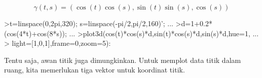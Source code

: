 \documentclass{article}
\begin{document}
\begin{eulernotebook}
\begin{eulercomment}
\begin{eulercomment}
\begin{eulercomment}
\end{eulercomment}
\begin{eulerformula}
\[
\gamma(t,s) = (\cos(t)\cos(s),\sin(t)\sin(s),\cos(s))
\]
\end{eulerformula}
\begin{eulercomment}
\end{eulercomment}
\begin{eulerprompt}
>t=linspace(0,2pi,320); s=linspace(-pi/2,pi/2,160)'; ...
>d=1+0.2*(cos(4*t)+cos(8*s)); ...
>plot3d(cos(t)*cos(s)*d,sin(t)*cos(s)*d,sin(s)*d,hue=1, ...
>  light=[1,0,1],frame=0,zoom=5):
\end{eulerprompt}
\begin{eulercomment}
Tentu saja, awan titik juga dimungkinkan. Untuk memplot data titik
dalam ruang, kita memerlukan tiga vektor untuk koordinat titik.


\end{eulercomment}
\end{eulercomment}
\end{eulercomment}
\end{eulernotebook}
\end{document}
